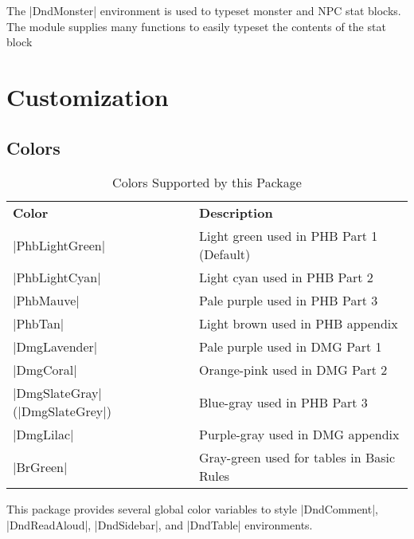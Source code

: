 \documentclass[letterpaper,twocolumn,openany,nodeprecatedcode]{dndbook}
\begin{document}
The |DndMonster| environment is used to typeset monster and NPC stat blocks. The module supplies many functions to easily typeset the contents of the stat block

\part{Customization}

\chapter{Colors}

\begin{table*}[b]
	\caption{\DndFontTableTitle{}Colors Supported by this Package}\label{tab:colors}

	\begin{tabularx}{\linewidth}{lX}
		\textbf{Color}                  & \textbf{Description}                      \\
		\rowcolor{PhbLightGreen}
		|PhbLightGreen|                 & Light green used in PHB Part 1 (Default)  \\
		\rowcolor{PhbLightCyan}
		|PhbLightCyan|                  & Light cyan used in PHB Part 2             \\
		\rowcolor{PhbMauve}
		|PhbMauve|                      & Pale purple used in PHB Part 3            \\
		\rowcolor{PhbTan}
		|PhbTan|                        & Light brown used in PHB appendix          \\
		\rowcolor{DmgLavender}
		|DmgLavender|                   & Pale purple used in DMG Part 1            \\
		\rowcolor{DmgCoral}
		|DmgCoral|                      & Orange-pink used in DMG Part 2            \\
		\rowcolor{DmgSlateGray}
		|DmgSlateGray| (|DmgSlateGrey|) & Blue-gray used in PHB Part 3              \\
		\rowcolor{DmgLilac}
		|DmgLilac|                      & Purple-gray used in DMG appendix          \\
		\rowcolor{BrGreen}
		|BrGreen|                       & Gray-green used for tables in Basic Rules \\
	\end{tabularx}
\end{table*}

This package provides several global color variables to style |DndComment|, |DndReadAloud|, |DndSidebar|, and |DndTable| environments.
\end{document}
